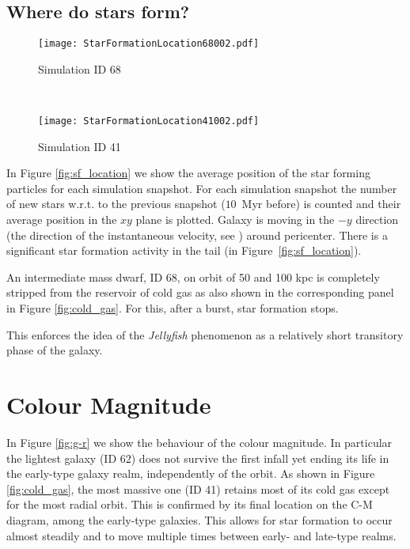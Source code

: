 \subsection{Where do stars form?}
\begin{figure*}
\centering
\begin{subfigure}[t]{0.7\textwidth}
\centering
\texttt{[image: StarFormationLocation68002.pdf]}
\caption{Simulation ID 68}
\end{subfigure}\\[2ex]
\begin{subfigure}[t]{0.7\textwidth}
\centering
\texttt{[image: StarFormationLocation41002.pdf]}
\caption{Simulation ID 41}
\end{subfigure}
\caption{Star formation location around first pericenter passage for simulation ID 68 and 41. Each subpanel corresponds to a different pericenter.
The size of the marker is proportional to the number of stars born in that time interval.
Markers are colored using the time from pericenter normalized with the radial period.
In correspondence of pericenter passage an intense star formation activity is registered in the gaseous tail.}
\label{fig:sf_location}
\end{figure*}
In Figure \ref{fig:sf_location} we show the average position of the star forming particles for each simulation snapshot.
For each simulation snapshot the number of new stars w.r.t. to the previous snapshot ($10$~Myr before) is counted and their average position in the $xy$ plane is plotted.
Galaxy is moving in the $-y$ direction (the direction of the instantaneous velocity, see ) around pericenter.
There is a significant star formation activity in the tail (in Figure~\ref{fig:sf_location}).

An intermediate mass dwarf, ID 68, on orbit of 50 and 100 kpc is completely stripped from the reservoir of cold gas as also shown in the corresponding panel in Figure \ref{fig:cold_gas}. For this, after a burst, star formation stops.

This enforces the idea of the \emph{Jellyfish} phenomenon as a relatively short transitory phase of the galaxy. 


\section{Colour Magnitude}
In Figure \ref{fig:g-r} we show the behaviour of the colour magnitude.
In particular the lightest galaxy (ID 62) does not survive the first infall yet ending its life in the early-type galaxy realm, independently of the orbit.
As shown in Figure \ref{fig:cold_gas}, the most massive one (ID 41) retains most of its cold gas except for the most radial orbit.
This is confirmed by its final location on the C-M diagram, among the early-type galaxies.
This allows for star formation to occur almost steadily and to move multiple times between early- and late-type realms.


